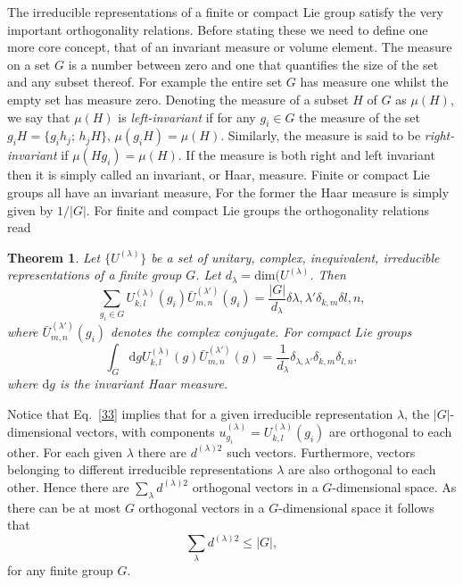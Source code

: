 \documentclass{article}
\newcommand\defn[1]{\textsl{#1}}
\newtheorem{theorem}{Theorem}
\begin{document}
The irreducible representations of a finite or compact Lie group satisfy the very important orthogonality relations.  Before stating these we need to define one more core concept, that of an invariant measure or volume element.  The measure on a set $G$ is a number between zero and one that  quantifies the size of the set and any subset thereof.  For example the entire set $G$ has measure one whilst the empty set has measure zero.  Denoting the measure of a subset $H$ of $G$ as $\mu(H)$, we say that $\mu(H)$ is \defn{left-invariant} if for any $g_i\in G$ the measure of the set $g_i H=\{g_ih_j; \, h_j H\}$, $\mu(g_iH)=\mu(H)$.  Similarly, the measure is said to be \defn{right-invariant} if $\mu(Hg_i)=\mu(H)$.  If the measure is both right and left invariant then it is simply called an invariant, or Haar, measure.  Finite or compact Lie groups all have an invariant measure, For the former the Haar measure is simply given by $1/\lvert G\rvert$.  For finite and compact Lie groups the orthogonality relations read
\begin{theorem}
Let $\{U^{(\lambda)}\}$ be a set of unitary, complex, inequivalent, irreducible representations of a finite group $G$.  Let $d_\lambda=\mathrm{dim}(U^{(\lambda)}$.  Then  
\begin{equation}
\sum_{g_i\in G} U^{(\lambda)}_{k,l}(g_i) \bar{U}^{(\lambda')}_{m,n}(g_i)=\frac{\lvert G\rvert}{d_\lambda}\delta{\lambda,\lambda'}\delta_{k,m}\delta{l,n},
\label{33}
\end{equation} 
where $\bar{U}^{(\lambda')}_{m,n}(g_i)$ denotes the complex conjugate.  For compact Lie groups
\begin{equation}
\int_G \mathrm{d}g U^{(\lambda)}_{k,l}(g) \bar{U}^{(\lambda')}_{m,n}(g)=\frac{1}{d_\lambda}\delta_{\lambda,\lambda'}\delta_{k,m}\delta_{l,n},
\label{34}
\end{equation}
where $\mathrm{d}g$ is the invariant Haar measure. 
\label{thm:5}
\end{theorem}
Notice that Eq.~\eqref{33} implies that for a given irreducible representation $\lambda$, the $\lvert G\rvert$-dimensional vectors, with components $u^{(\lambda)}_{g_i}=U^{(\lambda)}_{k,l}(g_i)$ are orthogonal to each other.  For each given $\lambda$ there are $d^{(\lambda)2}$ such vectors.  Furthermore, vectors belonging to different irreducible representations $\lambda$ are also orthogonal to each other.  Hence there are $\sum_\lambda d^{(\lambda)2}$ orthogonal vectors in a $G$-dimensional space.  As there can be at most $G$ orthogonal vectors in a $G$-dimensional space it follows that 
\begin{equation}
 \sum_\lambda d^{(\lambda)2}\leq\lvert G\rvert,
\label{35}
\end{equation}
for any finite group $G$.
 
\end{document}
